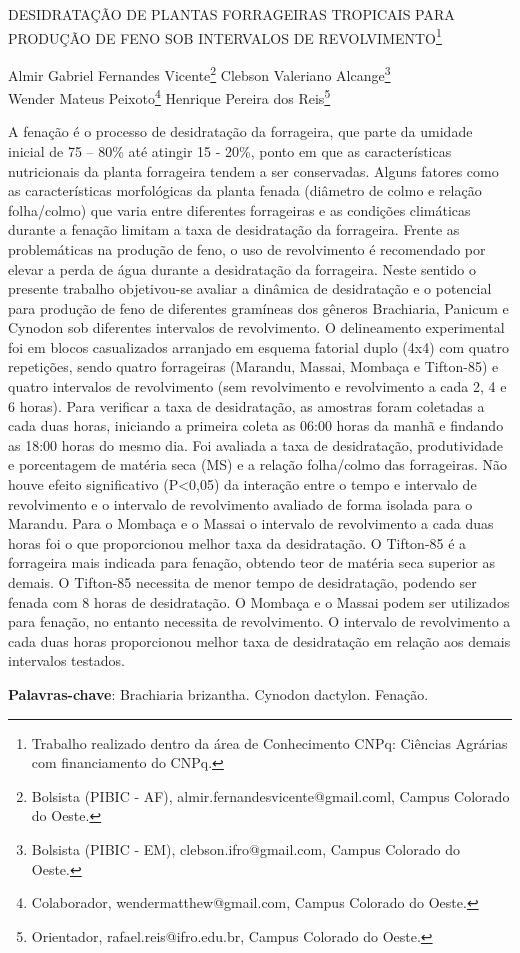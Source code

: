 \documentclass[article,12pt,onesidea,4paper,english,brazil]{abntex2}
\begin{document}
	
	
	\frenchspacing 
	
	\begin{center}
		\LARGE DESIDRATAÇÃO DE PLANTAS FORRAGEIRAS TROPICAIS PARA PRODUÇÃO DE FENO SOB INTERVALOS DE REVOLVIMENTO\footnote{Trabalho realizado dentro da área de Conhecimento CNPq: Ciências Agrárias com financiamento do CNPq.}
		
		\normalsize
		Almir Gabriel Fernandes Vicente\footnote{Bolsista (PIBIC - AF), almir.fernandesvicente@gmail.coml, Campus Colorado do Oeste.} 
	Clebson Valeriano Alcange\footnote{Bolsista (PIBIC - EM), clebson.ifro@gmail.com, Campus Colorado do Oeste.} \\
		Wender Mateus Peixoto\footnote{Colaborador, wendermatthew@gmail.com, Campus Colorado do Oeste.} 
		Henrique Pereira dos Reis\footnote{Orientador, rafael.reis@ifro.edu.br, Campus Colorado do Oeste.} 
	\end{center}
	
	\noindent A fenação é o processo de desidratação da forrageira, que parte da umidade inicial de 75 – 80\% até atingir 15 - 20\%, ponto em que as características nutricionais da planta forrageira tendem a ser conservadas. Alguns fatores como as características morfológicas da planta fenada (diâmetro de colmo e relação folha/colmo) que varia entre diferentes forrageiras e as condições climáticas durante a fenação limitam a taxa de desidratação da forrageira. Frente as problemáticas na produção de feno, o uso de revolvimento é recomendado por elevar a perda de água durante a desidratação da forrageira. Neste sentido o presente trabalho objetivou-se avaliar a dinâmica de desidratação e o potencial para produção de feno de diferentes gramíneas dos gêneros Brachiaria, Panicum e Cynodon sob diferentes intervalos de revolvimento. O delineamento experimental foi em blocos casualizados arranjado em esquema fatorial duplo (4x4) com quatro repetições, sendo quatro forrageiras (Marandu, Massai, Mombaça e Tifton-85) e quatro intervalos de revolvimento (sem revolvimento e revolvimento a cada 2, 4 e 6 horas). Para verificar a taxa de desidratação, as amostras foram coletadas a cada duas horas, iniciando a primeira coleta as 06:00 horas da manhã e findando as 18:00 horas do mesmo dia. Foi avaliada a taxa de desidratação, produtividade e porcentagem de matéria seca (MS) e a relação folha/colmo das forrageiras. Não houve efeito significativo (P<0,05) da interação entre o tempo e intervalo de revolvimento e o intervalo de revolvimento avaliado de forma isolada para o Marandu. Para o Mombaça e o Massai o intervalo de revolvimento a cada duas horas foi o que proporcionou melhor taxa da desidratação. O Tifton-85 é a forrageira mais indicada para fenação, obtendo teor de matéria seca superior as demais. O Tifton-85 necessita de menor tempo de desidratação, podendo ser fenada com 8 horas de desidratação. O Mombaça e o Massai podem ser utilizados para fenação, no entanto necessita de revolvimento. O intervalo de revolvimento a cada duas horas proporcionou melhor taxa de desidratação em relação aos demais intervalos testados.
	
	\vspace{\onelineskip}
	
	\noindent
	\textbf{Palavras-chave}: Brachiaria brizantha. Cynodon dactylon. Fenação.
	
\end{document}
